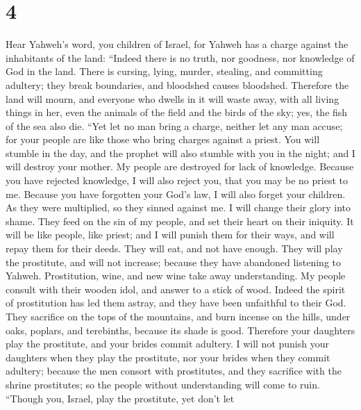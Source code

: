 \hypertarget{section-3}{%
\section{4}\label{section-3}}

 Hear Yahweh's word, you children of Israel, for Yahweh
has a charge against the inhabitants of the land: ``Indeed there is no
truth, nor goodness, nor knowledge of God in the land. 
There is cursing, lying, murder, stealing, and committing adultery; they
break boundaries, and bloodshed causes bloodshed. 
Therefore the land will mourn, and everyone who dwells in it will waste
away, with all living things in her, even the animals of the field and
the birds of the sky; yes, the fish of the sea also die. 
``Yet let no man bring a charge, neither let any man accuse; for your
people are like those who bring charges against a priest. 
You will stumble in the day, and the prophet will also stumble with you
in the night; and I will destroy your mother.  My people
are destroyed for lack of knowledge. Because you have rejected
knowledge, I will also reject you, that you may be no priest to me.
Because you have forgotten your God's law, I will also forget your
children.  As they were multiplied, so they sinned against
me. I will change their glory into shame.  They feed on
the sin of my people, and set their heart on their iniquity.
 It will be like people, like priest; and I will punish
them for their ways, and will repay them for their deeds.
 They will eat, and not have enough. They will play the
prostitute, and will not increase; because they have abandoned listening
to Yahweh.  Prostitution, wine, and new wine take away
understanding.  My people consult with their wooden idol,
and answer to a stick of wood. Indeed the spirit of prostitution has led
them astray, and they have been unfaithful to their God. 
They sacrifice on the tops of the mountains, and burn incense on the
hills, under oaks, poplars, and terebinths, because its shade is good.
Therefore your daughters play the prostitute, and your brides commit
adultery.  I will not punish your daughters when they
play the prostitute, nor your brides when they commit adultery; because
the men consort with prostitutes, and they sacrifice with the shrine
prostitutes; so the people without understanding will come to ruin.
 ``Though you, Israel, play the prostitute, yet don't let
